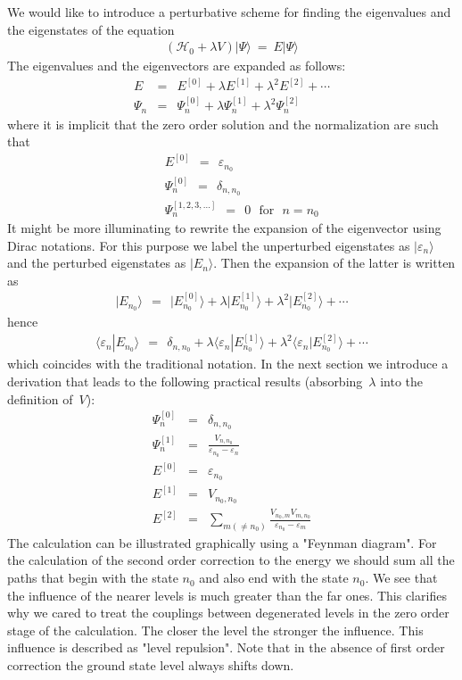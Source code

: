 \documentclass[onecolumn,fleqn]{revtex4}
\newcommand{\beq}{\begin{eqnarray}}
\newcommand{\eeq}{\end{eqnarray}}
\begin{document}
We would like to introduce a perturbative scheme 
for finding the eigenvalues and the eigenstates of    
the equation 
\beq
(\mathcal{H}_{0}+ \lambda V) | \Psi \rangle \ = \ E | \Psi \rangle
\eeq
The eigenvalues and the eigenvectors are expanded as follows:
\beq
E
&=& E^{[0]} 
+ \lambda E^{[1]} 
+ \lambda^2 E^{[2]} + \cdots 
\\ \nonumber
\Psi_{n} 
&=& \Psi_{n}^{[0]} 
+ \lambda \Psi_{n}^{[1]} 
+ \lambda^2 \Psi_{n}^{[2]} 
\eeq
where it is implicit that the zero order 
solution and the normalization are such that  
\beq
&& E^{[0]} \ \ = \ \ \varepsilon_{n_0}  
\\ \nonumber
&& \Psi_n^{[0]} \ \ = \ \ \delta_{n,n_0}
\\ \nonumber
&& \Psi_n^{[1,2,3, \dots ]} \ \ = \ \  0 \,\,\,\, \mbox{for} \,\,\,\, n=n_0 
\eeq
It might be more illuminating to rewrite the 
expansion of the eigenvector using Dirac notations.
For this purpose we label the unperturbed 
eigenstates as $|\varepsilon_n\rangle$ and the 
perturbed eigenstates as $|E_n\rangle$. 
Then the expansion of the latter is written as  
\beq
{|E_{n_0} \rangle} 
\ \ = \ \ {|E_{n_0}^{[0]} \rangle} 
+ \lambda { |E_{n_0}^{[1]} \rangle}
+ \lambda ^2{ |E_{n_0}^{[2]} \rangle} 
+ \cdots 
\eeq
hence
\beq
\langle \varepsilon_n | E_{n_0} \rangle 
\ \ = \ \ \delta_{n,n_0}
+ \lambda \langle \varepsilon_n | E_{n_0}^{[1]} \rangle 
+ \lambda^2 \langle \varepsilon_n | E_{n_0}^{[2]} \rangle 
+ \cdots 
\eeq
which coincides with the traditional notation.
In the next section we introduce a derivation that 
leads to the following practical results (absorbing~$\lambda$ into the definition of~$V$):
\beq
\Psi_n^{[0]} &=& \delta_{n,n_0}
\\ \nonumber
\Psi_n^{[1]} &=& \frac {V_{n,n_0}}{\varepsilon_{n_0}-\varepsilon_{n}}
\\ \nonumber
E^{[0]} &=& \varepsilon_{n_{0}}
\\ \nonumber
E^{[1]} &=& V_{n_{0},n_{0}}
\\ \nonumber
E^{[2]} &=& \sum_{m (\neq n_{0})} 
\frac{V_{n_{0},m} V_{m,n_{0}}}{\varepsilon_{n_{0}}-\varepsilon_{m}}
\eeq
The calculation can be illustrated graphically 
using a "Feynman diagram".  For the calculation of the 
second order correction to the energy we should 
sum all the paths that begin with the state ${n_{0}}$ 
and also end with the state ${n_{0}}$. 
We see that the influence of the nearer levels 
is much greater than the far ones.
This clarifies why we cared to treat the couplings 
between degenerated levels in the zero order stage 
of the calculation.  
The closer the level the stronger the influence. 
This influence is described as "level repulsion". 
Note that in the absence of first order correction 
the ground state level always shifts down. 
\end{document}
